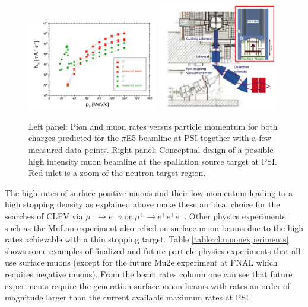 \begin{figure}[ht]
\includegraphics[width=0.51\textwidth]{ChargedLeptons/Figures/MuonRates.pdf}\hfill
\includegraphics[width=0.46\textwidth]{ChargedLeptons/Figures/HIMB.pdf}
\caption{Left panel: Pion and muon rates versus particle momentum for both charges predicted for the $\pi$E5 beamline at PSI together with a few measured data points. Right panel: Conceptual design of a possible high intensity muon beamline at the spallation source target at PSI. Red inlet is a zoom of the neutron target region.\label{fig:cl:muonrates}}
\end{figure}

The high rates of surface positive muons and their low momentum leading to a high stopping density as explained above make these an ideal choice for the searches of CLFV via $\mu^+\to e^+ \gamma$ or $\mu^+ \to e^+ e^+ e^-$. Other physics experiments such as the MuLan experiment \cite{Tishchenko:2012ie} also relied on surface muon beams due to the high rates achievable with a thin stopping target. Table \ref{table:cl:muonexperiments} shows some examples of finalized and future particle physics experiments that all use surface muons (except for the future Mu2e experiment at FNAL which requires negative muons). From the beam rates column one can see that future experiments require the generation surface muon beams with rates an order of magnitude larger than the current available maximum rates at PSI. 

